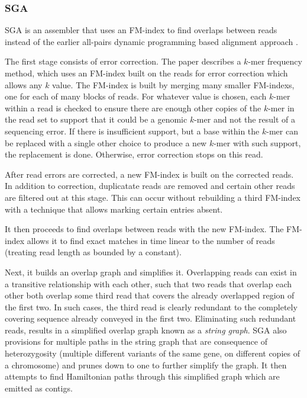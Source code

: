 \subsubsection{SGA}

SGA is an assembler that uses an FM-index to find overlaps between reads instead of the earlier all-pairs dynamic programming based alignment approach  \cite{simpson2010efficient}.  


The first stage consists of error correction.  The paper describes a $k$-mer frequency method, which uses an FM-index built on the reads for error correction which allows any $k$ value.%
The FM-index is built by merging many smaller FM-indexs, one for each of many blocks of reads.
For whatever value is chosen, each $k$-mer within a read is checked to ensure there are enough other copies of the $k$-mer in the read set to support that it could be a genomic $k$-mer and not the result of a sequencing error.
If there is insufficient support, but a base within the $k$-mer can be replaced with a single other choice to produce a new $k$-mer with such support, the replacement is done.
Otherwise, error correction stops on this read.

After read errors are corrected, a new FM-index is built on the corrected reads.
In addition to correction,  duplicatate reads are removed and certain other reads are filtered out at this stage.%
This can occur without rebuilding a third FM-index with a technique that allows  marking certain entries absent.

It then proceeds to find overlaps between reads with the new FM-index.
The FM-index allows it to find exact matches in time linear to the number of reads (treating read length as bounded by a constant).

Next, it builds an overlap graph and simplifies it.
Overlapping reads can exist in a transitive relationship with each other, such that two reads that overlap each other both overlap some third read that covers the already overlapped region of the first two.
In such cases, the third read is clearly redundant to the completely covering sequence already conveyed in the first two.
Eliminating such redundant reads, %
results in a simplified overlap graph known as a \emph{string graph}.
SGA also provisions for multiple paths in the string graph that are consequence of heterozygosity (multiple different variants of the same gene, on different copies of a chromosome) and prunes down to one to further simplify the graph.
It then attempts to find Hamiltonian paths through this simplified graph which are emitted as contigs.


